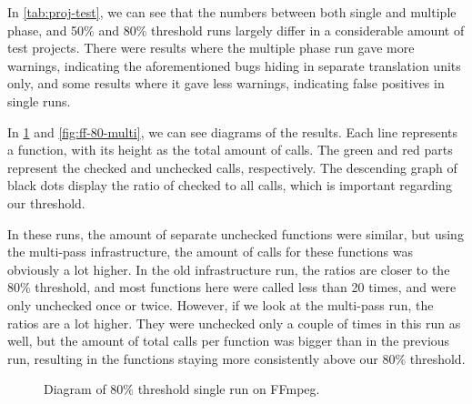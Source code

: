 
In \cref{tab:proj-test}, we can see that the numbers between both single and multiple phase, and 50\% and 80\% threshold runs largely differ
in a considerable amount of test projects. There were results where the multiple phase run gave more warnings, indicating the aforementioned
bugs hiding in separate translation units only, and some results where it gave less warnings, indicating false positives in single runs.

In \cref{fig:ff-80-single} and \cref{fig:ff-80-multi}, we can see diagrams of the results. Each line represents a function, with
its height as the total amount of calls. The green and red parts represent the checked and unchecked calls, respectively. The descending graph of black
dots display the ratio of checked to all calls, which is important regarding our threshold.

In these runs, the amount of separate unchecked functions were similar, but using the multi-pass infrastructure, the amount of calls for these functions was
obviously a lot higher. In the old infrastructure run, the ratios are closer to the 80\% threshold, and most functions here were called less than 20
times, and were only unchecked once or twice. However, if we look at the multi-pass run, the ratios are a lot higher. They were unchecked only
a couple of times in this run as well, but the amount of total calls per function was bigger than in the previous run, resulting in the
functions staying more consistently above our 80\% threshold.

\begin{figure}[H]
	\caption{Diagram of 80\% threshold single run on FFmpeg.}
	\label{fig:ff-80-single}
\end{figure}

